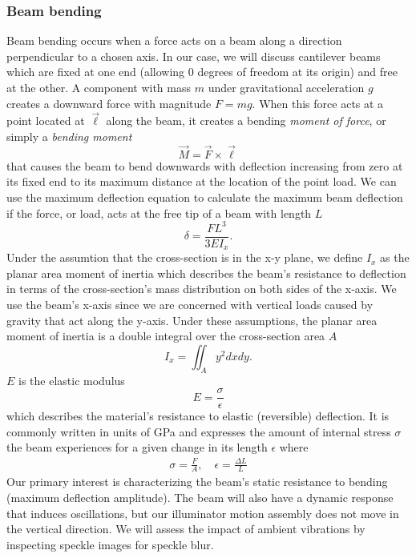 \subsubsection{Beam bending}
Beam bending occurs when a force acts on a beam along a direction perpendicular to a chosen axis. In our case, we will discuss cantilever beams which are fixed at one end (allowing 0 degrees of freedom at its origin) and free at the other. A component with mass $m$ under gravitational acceleration $g$ creates a downward force with magnitude $F=mg$. When this force acts at a point located at $\vec{\ell}$ along the beam, it creates a bending \textit{moment of force}, or simply a \textit{bending moment}
%
\begin{equation}
    \vec{M} = \vec{F} \times \vec{\ell}
    \label{eqn:torque_definition}
\end{equation}
%
that causes the beam to bend downwards with deflection increasing from zero at its fixed end to its maximum distance at the location of the point load. We can use the maximum deflection equation to calculate the maximum beam deflection if the force, or load, acts at the free tip of a beam with length $L$
%
\begin{equation}
    \delta = \frac{F L^3}{3EI_x}.
    \label{eqn:bending_max_deflection}
\end{equation}
%
Under the assumtion that the cross-section is in the x-y plane, we define $I_x$ as the planar area moment of inertia which describes the beam's resistance to deflection in terms of the cross-section's mass distribution on both sides of the x-axis. We use the beam's x-axis since we are concerned with vertical loads caused by gravity that act along the y-axis. Under these assumptions, the planar area moment of inertia is a double integral over the cross-section area $A$
%
\begin{equation}
    I_x = \iint_A y^2 dx dy.
\end{equation}
%
$E$ is the elastic modulus
%
\begin{equation}
    E = \frac{\sigma}{\epsilon}
\end{equation}
%
which describes the material's resistance to elastic (reversible) deflection. It is commonly written in units of \si{\GPa} and expresses the amount of internal stress $\sigma$ the beam experiences for a given change in its length $\epsilon$ where
% 
\begin{gather}
    \sigma = \frac{F}{A}, \quad \epsilon = \frac{\Delta L}{L}
\end{gather}
%
Our primary interest is characterizing the beam's static resistance to bending (maximum deflection amplitude). The beam will also have a dynamic response that induces oscillations, but our illuminator motion assembly does not move in the vertical direction. We will assess the impact of ambient vibrations by inspecting speckle images for speckle blur.

